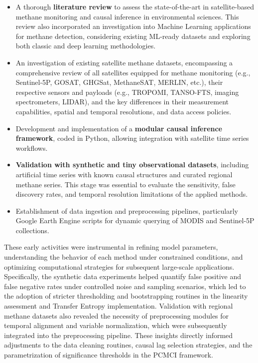\begin{itemize}
	\item A thorough \textbf{literature review} to assess the state-of-the-art in satellite-based methane monitoring and causal inference in environmental sciences. This review also incorporated an investigation into Machine Learning applications for methane detection, considering existing ML-ready datasets and exploring both classic and deep learning methodologies.
	\item An investigation of existing satellite methane datasets, encompassing a comprehensive review of all satellites equipped for methane monitoring (e.g., Sentinel-5P, GOSAT, GHGSat, MethaneSAT, MERLIN, etc.), their respective sensors and payloads (e.g., TROPOMI, TANSO-FTS, imaging spectrometers, LIDAR), and the key differences in their measurement capabilities, spatial and temporal resolutions, and data access policies.
	\item Development and implementation of a \textbf{modular causal inference framework}, coded in Python, allowing integration with satellite time series workflows.
	\item \textbf{Validation with synthetic and tiny observational datasets}, including artificial time series with known causal structures and curated regional methane series. This stage was essential to evaluate the sensitivity, false discovery rates, and temporal resolution limitations of the applied methods.
	\item Establishment of data ingestion and preprocessing pipelines, particularly Google Earth Engine scripts for dynamic querying of MODIS and Sentinel-5P collections.
\end{itemize}

These early activities were instrumental in refining model parameters, understanding the behavior of each method under constrained conditions, and optimizing computational strategies for subsequent large-scale applications. Specifically, the synthetic data experiments helped quantify false positive and false negative rates under controlled noise and sampling scenarios, which led to the adoption of stricter thresholding and bootstrapping routines in the linearity assessment and Transfer Entropy implementation. Validation with regional methane datasets also revealed the necessity of preprocessing modules for temporal alignment and variable normalization, which were subsequently integrated into the preprocessing pipeline. These insights directly informed adjustments to the data cleaning routines, causal lag selection strategies, and the parametrization of significance thresholds in the PCMCI framework.

